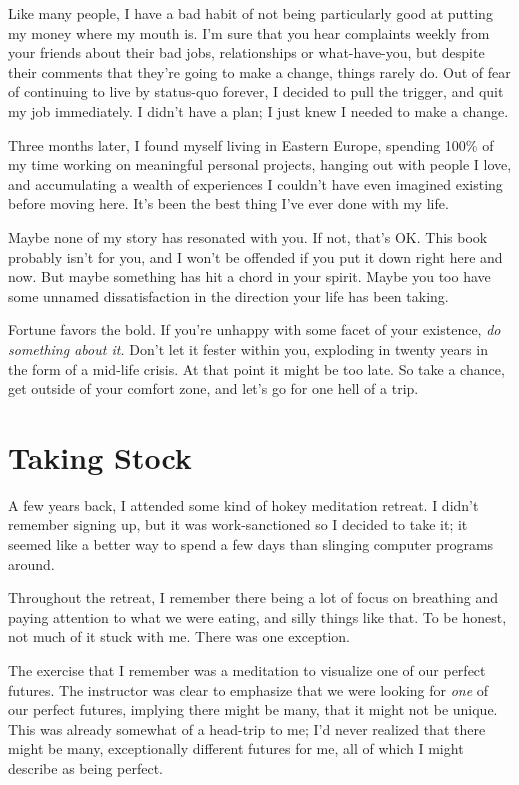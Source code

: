 \documentclass[]{book}
\begin{document}
Like many people, I have a bad habit of not being particularly good at putting
my money where my mouth is.  I'm sure that you hear
complaints weekly from your friends about their bad jobs, relationships or
what-have-you, but despite their comments that they're going to make a change,
things rarely do. Out of fear of continuing to live by status-quo forever, I
decided to pull the trigger, and quit my job immediately. I didn't have a plan;
I just knew I needed to make a change.

Three months later, I found myself living in Eastern Europe, spending 100\% of
my time working on meaningful personal projects, hanging out with people I love,
and accumulating a wealth of experiences I couldn't have even imagined existing
before moving here. It's been the best thing I've ever done with my life.

Maybe none of my story has resonated with you. If not, that's OK. This book
probably isn't for you, and I won't be offended if you put it down right here
and now. But maybe something has hit a chord in your spirit. Maybe you too have
some unnamed dissatisfaction in the direction your life has been taking.

Fortune favors the bold. If you're unhappy with some facet of your existence,
\emph{do something about it.} Don't let it fester within you, exploding in
twenty years in the form of a mid-life crisis. At that point it might be too
late. So take a chance, get outside of your comfort zone, and let's go for one
hell of a trip.


\chapter{Taking Stock}

A few years back, I attended some kind of hokey meditation retreat. I didn't
remember signing up, but it was work-sanctioned so I decided to take it; it
seemed like a better way to spend a few days than slinging computer programs
around.

Throughout the retreat, I remember there being a lot of focus on breathing and
paying attention to what we were eating, and silly things like that. To be
honest, not much of it stuck with me. There was one exception.

The exercise that I remember was a meditation to visualize one of our perfect
futures. The instructor was clear to emphasize that we were looking for
\emph{one} of our perfect futures, implying there might be many, that it
might not be unique. This was already somewhat of a head-trip to me; I'd never
realized that there might be many, exceptionally different futures for me, all
of which I might describe as being perfect.
\end{document}
